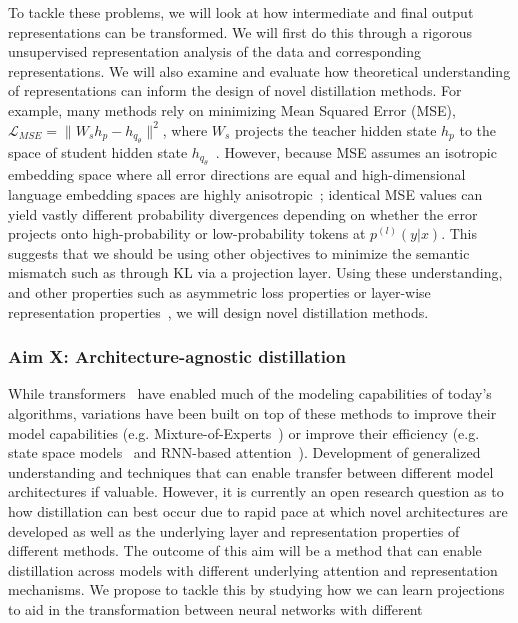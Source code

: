 To tackle these problems, we will look at how intermediate and final output representations can be transformed. We will first do this through a rigorous unsupervised representation analysis of the data and corresponding representations. We will also examine and evaluate how theoretical understanding of representations can inform the design of novel distillation methods. For example, many methods rely on minimizing Mean Squared Error (MSE), $\mathcal{L}_{MSE} = \|W_s h_p - h_{q_\theta}\|^2$, where $W_s$ projects the teacher hidden state $h_p$ to the space of student hidden state $h_{q_\theta}$~\cite{romero2014fitnets,jiao2021improving}. However, because MSE assumes an isotropic embedding space where all error directions are equal and high-dimensional language embedding spaces are highly anisotropic~\cite{ethayarajh2019contextual}; identical MSE values can yield vastly different probability divergences depending on whether the error projects onto high-probability or low-probability tokens at $p^{(l)} (y | x)$. This suggests that we should be using other objectives to minimize the semantic mismatch such as through KL via a projection layer. Using these understanding, and other properties such as asymmetric loss properties or layer-wise representation properties~\cite{nostalgebraist2020interpreting}, we will design novel distillation methods.


\subsubsection{Aim X: Architecture-agnostic distillation}
While transformers~\cite{vaswani2017attention} have enabled much of the modeling capabilities of today's algorithms, variations have been built on top of these methods to improve their model capabilities (e.g. Mixture-of-Experts~\cite{deepseekai2024deepseekv3, qwenteam2025qwen3, geminiteam2024gemini15, kimiteam2025kimik2, jiang2024mixtral}) or improve their efficiency (e.g. state space models~\cite{gu2023mamba} and RNN-based attention~\cite{beck2024xlstm, peng2023rwkv}). Development of generalized understanding and techniques that can enable transfer between different model architectures if valuable. However, it is currently an open research question as to how distillation can best occur due to rapid pace at which novel architectures are developed as well as the underlying layer and representation properties of different methods. The outcome of this aim will be a method that can enable distillation across models with different underlying attention and representation mechanisms. We propose to tackle this by studying how we can learn projections to aid in the transformation between neural networks with different 

